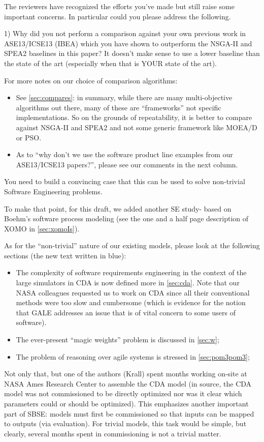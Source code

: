 \documentclass[10pt,journal,compsoc]{IEEEtran}
\newcommand{\bi}{\begin{itemize}}
\newcommand{\ei}{\end{itemize}}
\newcommand{\tion}[1]{\textsection\ref{sec:#1}}
\newenvironment{changed}{\par}{\par}
\begin{document}
The reviewers have recognized the efforts you've made but still raise some important concerns.  In particular could you please address the following.


1) Why did you not perform a comparison against your own previous work in ASE13/ICSE13 (IBEA) which you have shown to outperform the NSGA-II and SPEA2 baselines in this paper?   It doesn't make sense to use a lower baseline than the state of the art (especially when that is YOUR state of the art).

\begin{changed}


For more notes on our choice of comparison algorithms:
\bi
\item
See \tion{compares}: in summary, while there are many multi-objective algorithms out
there, many of these are ``frameworks'' not specific implementations.
So on the grounds of repeatability, it is better to compare against
NSGA-II and SPEA2 and not some generic framework like MOEA/D or PSO.
\item As to ``why don't we use the software product line examples from
our ASE13/ICSE13 papers?'', please see our comments in the next column.
\ei


\end{changed}

You need to build a convincing case that this can be
used to solve non-trivial Software Engineering
problems.  
\begin{changed}
To make that point, for this draft,
we added another SE study- based on Boehm's
software process modeling (see the one and a half page description
of XOMO in \tion{xomoIs}).


As for the ``non-trivial'' nature of our existing models,
please look at the following sections (the new text written in blue):
\bi
\item
The complexity of software requirements engineering in the context
of the large simulators in CDA is now defined more in \tion{cda}.
Note that our NASA colleagues requested us to work on CDA
since all their conventional methods were too slow and cumbersome (which is
evidence for the notion that GALE addresses an issue that is of
vital concern to some users of software).
\item
The ever-present ``magic weights'' problem is discussed in \tion{w};
\item
The problem of reasoning over agile systems is stressed in \tion{pom3pom3};
\ei

Not only that, but one of the authors (Krall)
spent months working on-site at NASA Ames Research Center to assemble the CDA model (in source,
the CDA model was not commissioned to be directly optimized nor was it clear which parameters could
or should be optimized).  This emphasizes another important part of SBSE: models must first be commissioned
so that inputs can be mapped to outputs (via evaluation).  For trivial models, this task would be simple, but
clearly, several months spent in commissioning is not a trivial matter.
\end{changed}
\end{document}
